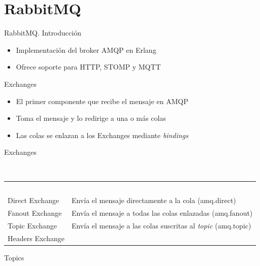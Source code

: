\documentclass{beamer}
\begin{document}
  \section{RabbitMQ}
  \begin{frame}{RabbitMQ. Introducción}
    \begin{itemize}
      \item Implementación del broker AMQP en Erlang
      \item Ofrece soporte para HTTP, STOMP y MQTT
    \end{itemize}
  \end{frame}

  \begin{frame}{Exchanges}
    \begin{itemize}
      \item El primer componente que recibe el mensaje en AMQP
      \item Toma el mensaje y lo redirige a una o más colas
      \item Las colas se enlazan a los Exchanges mediante \textit{bindings}
    \end{itemize}
  \end{frame}

  \begin{frame}{Exchanges}
    \begin{block}{~\vspace{0.7cm}}
      \begin{center}
      \vspace{-0.65cm}
      \begin{tabular}{p{}|p{}}
        \textcolor{white}{\bf Tipo} & \textcolor{white}{\bf Descripción} \\
          Direct Exchange &  Envía el mensaje directamente a la cola (amq.direct)\\ \hline
          Fanout Exchange &  Envía el mensaje a todas las colas enlazadas (amq.fanout) \\ \hline
          Topic Exchange &  Envía el mensaje a las colas suscritas al \textit{topic} (amq.topic)\\ \hline
          Headers Exchange &  \\
      \end{tabular}
      \end{center}
    \end{block}
  \end{frame}

  \begin{frame}{Topics}

  \end{frame}
\end{document}
